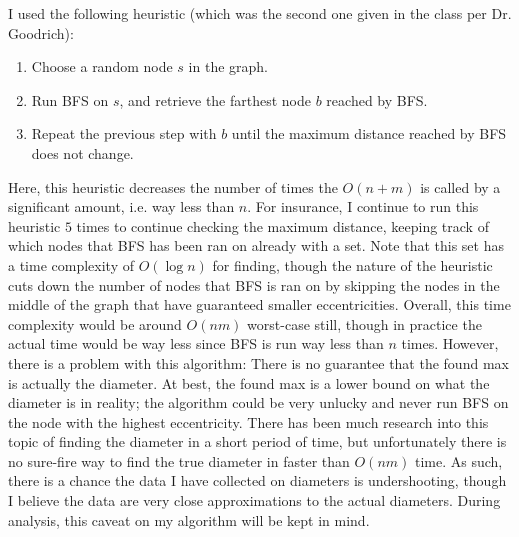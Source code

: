 \documentclass{article}
\begin{document}
    \noindent I used the following heuristic (which was the second one given
    in the class per Dr. Goodrich):
    \begin{enumerate}
        \item Choose a random node $s$ in the graph.
        \item Run BFS on $s$, and retrieve the farthest node $b$ reached by BFS.
        \item Repeat the previous step with $b$ until the maximum distance
            reached by BFS does not change.
    \end{enumerate}
    Here, this heuristic decreases the number of times the $O(n + m)$ is called
    by a significant amount, i.e. way less than $n$. For insurance, I continue
    to run this heuristic $5$ times to continue checking the maximum distance,
    keeping track of which nodes that BFS has been ran on already with a set.
    Note that this set has a time complexity of $O(\log{n})$ for finding, though 
    the nature of the heuristic cuts down the number of nodes that BFS is ran
    on by skipping the nodes in the middle of the graph that have guaranteed
    smaller eccentricities. Overall, this time complexity would be around
    $O(nm)$ worst-case still, though in practice the actual time would be way
    less since BFS is run way less than $n$ times.
    \nextblurb
    However, there is a problem with this algorithm: There is no guarantee that
    the found max is actually the diameter. At best, the found max is a lower
    bound on what the diameter is in reality; the algorithm could be very
    unlucky and never run BFS on the node with the highest eccentricity. There
    has been much research into this topic of finding the diameter in a short
    period of time, but unfortunately there is no sure-fire way to find the
    true diameter in faster than $O(nm)$ time. As such, there is a chance the
    data I have collected on diameters is undershooting, though I believe the
    data are very close approximations to the actual diameters. During analysis,
    this caveat on my algorithm will be kept in mind.
\end{document}
